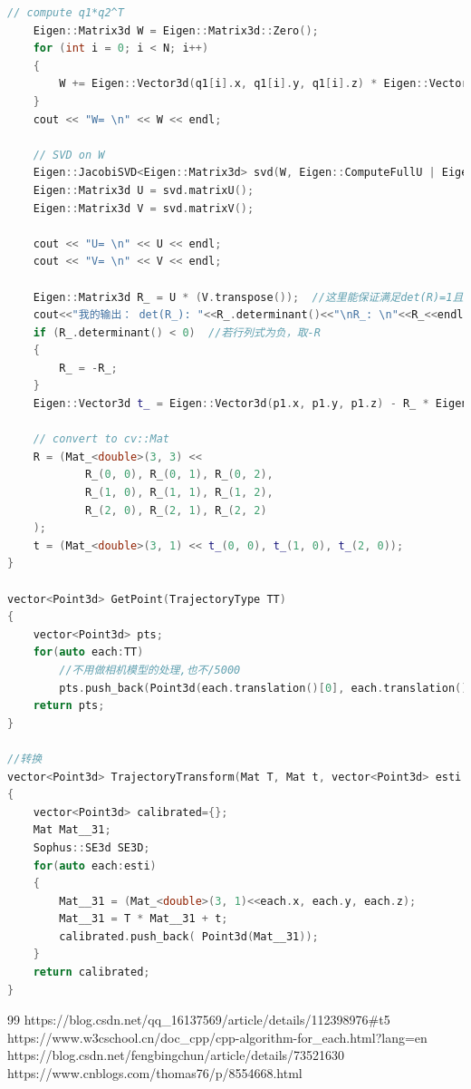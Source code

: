 \documentclass[40pt,a4paper，UTF8]{ctexart}
\numberwithin{equation}{section}
\begin{document}
\begin{lstlisting}[language=C++, caption=main.cpp]
    // compute q1*q2^T
    Eigen::Matrix3d W = Eigen::Matrix3d::Zero();
    for (int i = 0; i < N; i++)
    {
        W += Eigen::Vector3d(q1[i].x, q1[i].y, q1[i].z) * Eigen::Vector3d(q2[i].x, q2[i].y, q2[i].z).transpose();  //这里是2->1  R12,求R21要转置
    }
    cout << "W= \n" << W << endl;

    // SVD on W
    Eigen::JacobiSVD<Eigen::Matrix3d> svd(W, Eigen::ComputeFullU | Eigen::ComputeFullV);  //Eigen的svd函数，计算满秩的U和V
    Eigen::Matrix3d U = svd.matrixU();
    Eigen::Matrix3d V = svd.matrixV();

    cout << "U= \n" << U << endl;
    cout << "V= \n" << V << endl;

    Eigen::Matrix3d R_ = U * (V.transpose());  //这里能保证满足det(R)=1且正交吗？
    cout<<"我的输出： det(R_): "<<R_.determinant()<<"\nR_: \n"<<R_<<endl;  //Eigen的Mat
    if (R_.determinant() < 0)  //若行列式为负，取-R
    {
        R_ = -R_;
    }
    Eigen::Vector3d t_ = Eigen::Vector3d(p1.x, p1.y, p1.z) - R_ * Eigen::Vector3d(p2.x, p2.y, p2.z);   //最优的t=p-Rp'

    // convert to cv::Mat
    R = (Mat_<double>(3, 3) <<
            R_(0, 0), R_(0, 1), R_(0, 2),
            R_(1, 0), R_(1, 1), R_(1, 2),
            R_(2, 0), R_(2, 1), R_(2, 2)
    );
    t = (Mat_<double>(3, 1) << t_(0, 0), t_(1, 0), t_(2, 0));
}

vector<Point3d> GetPoint(TrajectoryType TT)
{
    vector<Point3d> pts;
    for(auto each:TT)
        //不用做相机模型的处理,也不/5000
        pts.push_back(Point3d(each.translation()[0], each.translation()[1], each.translation()[2]));
    return pts;
}

//转换
vector<Point3d> TrajectoryTransform(Mat T, Mat t, vector<Point3d> esti )
{
    vector<Point3d> calibrated={};
    Mat Mat__31;
    Sophus::SE3d SE3D;
    for(auto each:esti)
    {
        Mat__31 = (Mat_<double>(3, 1)<<each.x, each.y, each.z);
        Mat__31 = T * Mat__31 + t;
        calibrated.push_back( Point3d(Mat__31));
    }
    return calibrated;
}
\end{lstlisting}


\begin{thebibliography}{99}  
https://blog.csdn.net/qq\_16137569/article/details/112398976\#t5
https://www.w3cschool.cn/doc\_cpp/cpp-algorithm-for\_each.html?lang=en
https://blog.csdn.net/fengbingchun/article/details/73521630
https://www.cnblogs.com/thomas76/p/8554668.html
\end{thebibliography}
\end{document}
